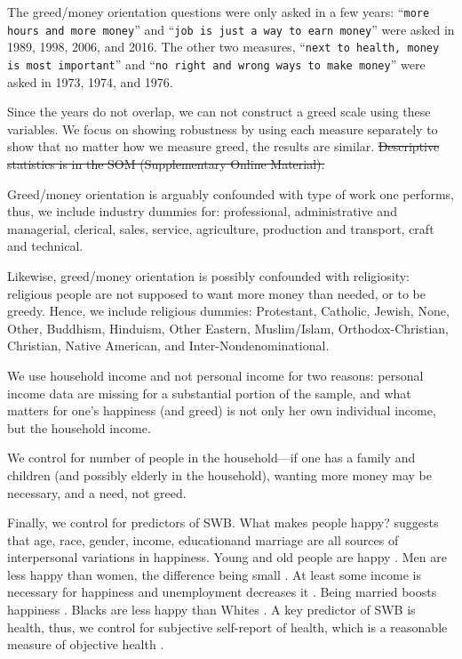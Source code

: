 \documentclass[10pt, letterpaper]{article}
\providecommand{\DIFaddtex}[1]{{\protect\color{blue}\uwave{#1}}} %
\providecommand{\DIFdeltex}[1]{{\protect\color{red}\sout{#1}}}                      %
\providecommand{\DIFaddbegin}{} %
\providecommand{\DIFaddend}{} %
\providecommand{\DIFdelbegin}{} %
\providecommand{\DIFdelend}{} %
\providecommand{\DIFadd}[1]{\texorpdfstring{\DIFaddtex{#1}}{#1}} %
\providecommand{\DIFdel}[1]{\texorpdfstring{\DIFdeltex{#1}}{}} %
\newcommand{\DIFscaledelfig}{0.5}
\newlength{\DIFdelgraphicswidth} %
\newlength{\DIFdelgraphicsheight} %
\newcommand{\DIFaddincludegraphics}[2][]{{\color{blue}\fbox{\DIFOincludegraphics[#1]{#2}}}} %
\newcommand{\DIFdelincludegraphics}[2][]{%
\sbox{\DIFdelgraphicsbox}{\DIFOincludegraphics[#1]{#2}}%
\settoboxwidth{\DIFdelgraphicswidth}{\DIFdelgraphicsbox} %
\settoboxtotalheight{\DIFdelgraphicsheight}{\DIFdelgraphicsbox} %
\scalebox{\DIFscaledelfig}{%
\parbox[b]{\DIFdelgraphicswidth}{\usebox{\DIFdelgraphicsbox}\\[-\baselineskip] \rule{\DIFdelgraphicswidth}{0em}}\llap{\resizebox{\DIFdelgraphicswidth}{\DIFdelgraphicsheight}{%
\setlength{\unitlength}{\DIFdelgraphicswidth}%
\begin{picture}(1,1)%
\thicklines\linethickness{2pt} %
{\color[rgb]{1,0,0}\put(0,0){\framebox(1,1){}}}%
{\color[rgb]{1,0,0}\put(0,0){\line( 1,1){1}}}%
{\color[rgb]{1,0,0}\put(0,1){\line(1,-1){1}}}%
\end{picture}%
}\hspace*{3pt}}} %
} %
\DeclareRobustCommand{\DIFaddbegin}{\DIFOaddbegin \let\includegraphics\DIFaddincludegraphics} %
\DeclareRobustCommand{\DIFaddend}{\DIFOaddend \let\includegraphics\DIFOincludegraphics} %
\DeclareRobustCommand{\DIFdelbegin}{\DIFOdelbegin \let\includegraphics\DIFdelincludegraphics} %
\DeclareRobustCommand{\DIFdelend}{\DIFOaddend \let\includegraphics\DIFOincludegraphics} %
\begin{document}
\begin{spacing}{1.8}
The greed/money orientation questions were only asked in a few years:
``\texttt{more hours and more money}'' and ``\texttt{job is just a way to earn money}''
were asked in 1989, 1998, 2006, and 2016. The other two measures, ``\texttt{next
  to  health, money is most  important}'' and ``\texttt{no right and wrong  ways to
  make money}'' were asked in 1973, 1974, and 1976.

Since the years do not overlap, we can not construct a greed scale using these variables. We focus on
showing robustness by using each measure separately to show that no matter how we measure greed, the results are similar. 
%
\DIFdelbegin \DIFdel{Descriptive statistics is in the SOM (Supplementary Online Material).
}\DIFdelend %

Greed/money orientation is arguably confounded with type of work one performs, thus, we include industry dummies for: professional, administrative and managerial, clerical, sales, service, agriculture, production and transport, craft and technical.           
\DIFdelbegin %

\DIFdelend %
Likewise, greed/money orientation is possibly confounded with religiosity:
religious people are not supposed to want more money than needed, or to be
greedy. Hence, we include religious dummies: Protestant, Catholic, Jewish, None,
Other, Buddhism, Hinduism, Other Eastern, Muslim/Islam, Orthodox-Christian,
Christian, Native American, and Inter-Nondenominational.

We use household income and not personal income for two reasons: personal income data are missing for a substantial portion of the sample, and  what matters for one's happiness (and greed) is not only her own individual income, but the household income.
\DIFdelbegin %

\DIFdelend %
We control for number of people in the household---if one has a family and
children (and possibly elderly in the household), wanting more money may be
necessary, and a need, not greed.

Finally, we control for predictors of SWB. What makes people happy?
\citet{myers00} suggests that age, race, gender, income, education\DIFaddbegin \DIFadd{, }\DIFaddend and marriage are all sources of interpersonal variations in happiness. Young and old people
are happy  \citep[e.g.,][]{teksoz}. Men are less happy than women, the difference being small \citep{blanchflower04o}. At least some income is necessary for happiness and unemployment decreases it
    \citep[e.g.,][]{ditella01moa,ditella01mob,ditella06m}. Being married boosts happiness \citep[e.g.,][]{myers00,diener04s}.
     Blacks are less happy than Whites
    \citep[e.g.,][]{aokcities,aok11a,blanchflower04o}.   
     A key predictor of SWB is health, thus, we control for subjective self-report of health, which is a reasonable measure of objective health \citep{subramanian09b}.


\end{spacing}
\end{document}
